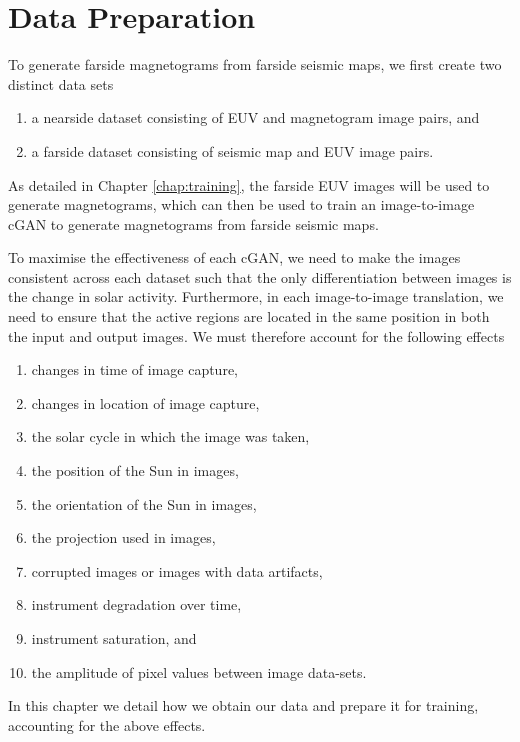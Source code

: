 \documentclass[11pt,a4paper,onecolumn]{report}
\begin{document}






%
%
%
%
\chapter{Data Preparation}
\label{chap:data}
%
%
%
%

To generate farside magnetograms from farside seismic maps, we first create two
distinct data sets
\begin{enumerate}
  \item a nearside dataset consisting of EUV and magnetogram image pairs, and
  \item a farside dataset consisting of seismic map and EUV image pairs.
\end{enumerate}
As detailed in Chapter \ref{chap:training}, the farside EUV images will be used
to generate magnetograms, which can then be used to train an image-to-image cGAN
to generate magnetograms from farside seismic maps. 


To maximise the effectiveness of each cGAN, we need to make the images consistent
across each dataset such that the only differentiation between images is the
change in solar activity. Furthermore, in each image-to-image translation, we
need to ensure that the active regions are located in the same position in both the
input and output images. We must therefore account for the following effects
\begin{enumerate}[i]
  \item changes in time of image capture, 
  \item changes in location of image capture,
  \item the solar cycle in which the image was taken,
  \item the position of the Sun in images,
  \item the orientation of the Sun in images,
  \item the projection used in images,
  \item corrupted images or images with data artifacts,
  \item instrument degradation over time,
  \item instrument saturation, and
  \item the amplitude of pixel values between image data-sets.
\end{enumerate}
In this chapter we detail how we obtain our data and prepare it for training,
accounting for the above effects.
\end{document}
